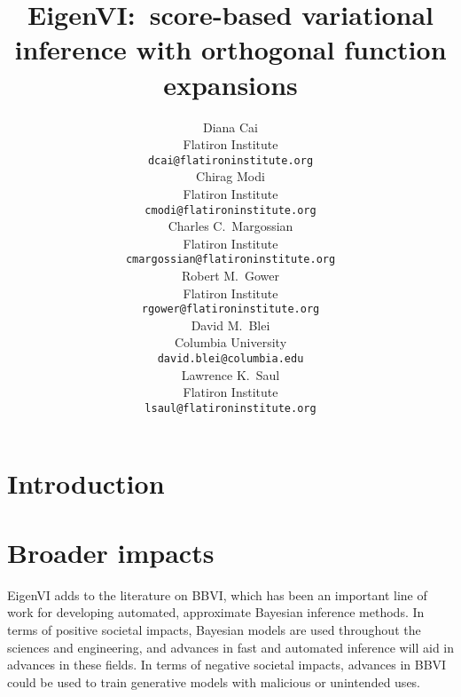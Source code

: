 \documentclass{article}
\title{EigenVI:\ score-based variational inference with orthogonal function expansions}
\author{%
    Diana Cai \\
    Flatiron Institute \\
    \texttt{dcai@flatironinstitute.org} \\
  \And
    Chirag Modi \\
    Flatiron Institute \\
  \texttt{cmodi@flatironinstitute.org} \\
  \And
    Charles C.\ Margossian \\
    Flatiron Institute \\
  \texttt{cmargossian@flatironinstitute.org} \\
  \And
    Robert M.\ Gower \\
    Flatiron Institute \\
  \texttt{rgower@flatironinstitute.org} \\
 \AND
    David M.\ Blei \\
    Columbia University \\
  \texttt{david.blei@columbia.edu} \\
  \And
    Lawrence K.\ Saul \\
    Flatiron Institute \\
  \texttt{lsaul@flatironinstitute.org} \\
}
\theoremstyle{definition}
\begin{document}
\maketitle


\begin{abstract}

\end{abstract}


\section{Introduction}




















\newpage

\appendix








\section{Broader impacts}

EigenVI adds to the literature on BBVI,
which has been an important line of work for developing automated, approximate
Bayesian inference methods.
In terms of positive societal impacts, Bayesian models are used
throughout the sciences and engineering, and advances in fast
and automated inference will aid in advances in these fields.
In terms of negative societal impacts, advances in BBVI could be
used to train generative models with malicious or unintended uses.



\end{document}
